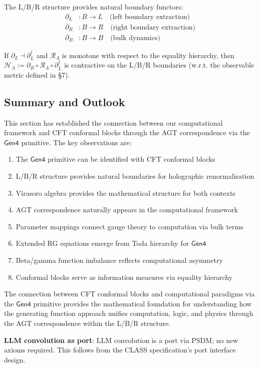 \begin{definition}
\label{def:lbr-boundary-functors}
The L/B/R structure provides natural boundary functors:
\begin{align}
\partial_L &: B \to L \quad \text{(left boundary extraction)} \\
\partial_R &: B \to R \quad \text{(right boundary extraction)} \\
\partial_B &: B \to B \quad \text{(bulk dynamics)}
\end{align}
\end{definition}

\begin{proposition}
\label{prop:lbr-boundary-adjunction}
If $\partial_L \dashv \partial_L^\dagger$ and $\mathcal{R}_\Lambda$ is monotone with respect to the equality hierarchy, then $\mathcal{H}_\Lambda := \partial_R \circ \mathcal{R}_\Lambda \circ \partial_L^\dagger$ is contractive on the L/B/R boundaries (w.r.t. the observable metric defined in §7).
\end{proposition}

\subsection{Summary and Outlook}

This section has established the connection between our computational framework and CFT conformal blocks through the AGT correspondence via the $\mathsf{Gen4}$ primitive. The key observations are:

\begin{enumerate}
\item The $\mathsf{Gen4}$ primitive can be identified with CFT conformal blocks
\item L/B/R structure provides natural boundaries for holographic renormalisation
\item Virasoro algebra provides the mathematical structure for both contexts
\item AGT correspondence naturally appears in the computational framework
\item Parameter mappings connect gauge theory to computation via bulk terms
\item Extended RG equations emerge from Toda hierarchy for $\mathsf{Gen4}$
\item Beta/gamma function imbalance reflects computational asymmetry
\item Conformal blocks serve as information measures via equality hierarchy
\end{enumerate}

The connection between CFT conformal blocks and computational paradigms via the $\mathsf{Gen4}$ primitive provides the mathematical foundation for understanding how the generating function approach unifies computation, logic, and physics through the AGT correspondence within the L/B/R structure. 

\textbf{LLM convolution as port}: LLM convolution is a port via PSDM; no new axioms required. This follows from the CLASS specification's port interface design.
